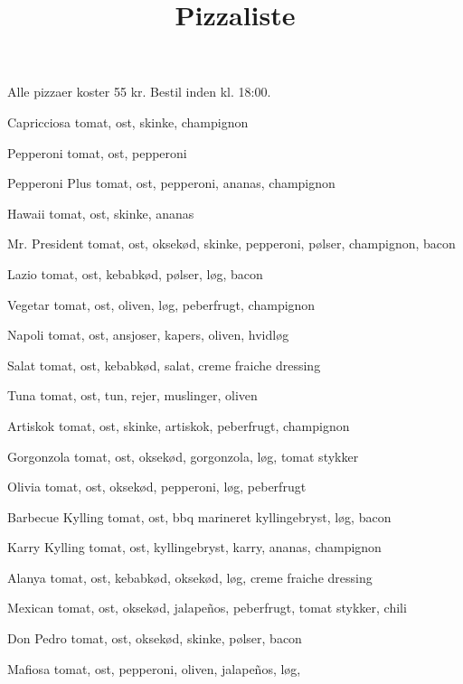 

\title{Pizzaliste}
\date{}


\maketitle


Alle pizzaer koster 55 kr. Bestil inden kl. 18:00.

\begin{multicols}{2}
  \begin{enumdescription}
  \item[Capricciosa] tomat, ost, skinke, champignon
  \item[Pepperoni] tomat, ost, pepperoni
  \item[Pepperoni Plus] tomat, ost, pepperoni, ananas, champignon
  \item[Hawaii] tomat, ost, skinke, ananas
  \item[Mr. President] tomat, ost, oksekød, skinke, pepperoni, pølser,
    champignon, bacon
  \item[Lazio] tomat, ost, kebabkød, pølser, løg, bacon
  \item[Vegetar] tomat, ost, oliven, løg, peberfrugt, champignon
  \item[Napoli] tomat, ost, ansjoser, kapers, oliven, hvidløg
  \item[Salat] tomat, ost, kebabkød, salat, creme fraiche dressing
  \item[Tuna] tomat, ost, tun, rejer, muslinger, oliven
  \item[Artiskok] tomat, ost, skinke, artiskok, peberfrugt, champignon
  \item[Gorgonzola] tomat, ost, oksekød, gorgonzola, løg, tomat
    stykker
  \item[Olivia] tomat, ost, oksekød, pepperoni, løg, peberfrugt
  \item[Barbecue Kylling] tomat, ost, bbq marineret kyllingebryst,
    løg, bacon
  \item[Karry Kylling] tomat, ost, kyllingebryst, karry, ananas,
    champignon
  \item[Alanya] tomat, ost, kebabkød, oksekød, løg, creme fraiche
    dressing
  \item[Mexican] tomat, ost, oksekød, jalapeños, peberfrugt, tomat
    stykker, chili
  \item[Don Pedro] tomat, ost, oksekød, skinke, pølser, bacon
  \item[Mafiosa] tomat, ost, pepperoni, oliven, jalapeños, løg,

\end{enumdescription}
\end{multicols}
